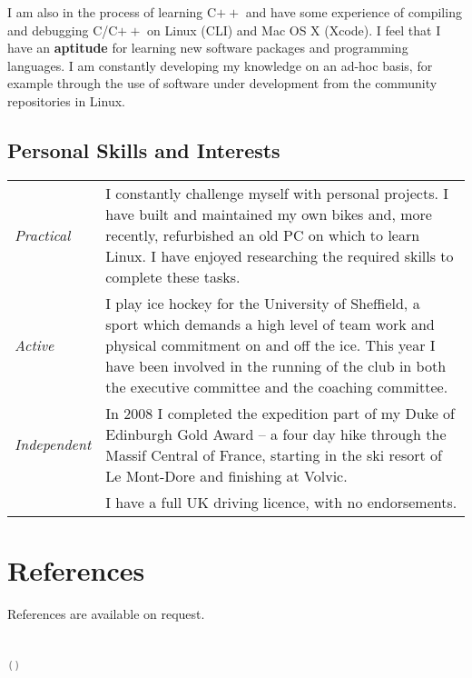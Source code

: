 \documentclass[oneside,a4paper]{article}
\begin{document}
I am also in the process of learning C$++$ and have some experience of compiling and debugging C/C$++$ on Linux (CLI) and Mac OS X (Xcode). I feel that I have an {\bf aptitude} for learning new software packages and programming languages. I am constantly developing my knowledge on an ad-hoc basis, for example  through the use of software under development from the community repositories in Linux.

\subsection*{Personal Skills and Interests}

\hspace{-6pt}\begin{tabular}{>{\it}lp{430pt}}
Practical & I constantly challenge myself with personal projects. I have built and maintained my own bikes and, more recently, refurbished an old PC on which to learn Linux. I have enjoyed researching the required skills to complete these tasks. \\[4pt]
Active & I play ice hockey for the University of Sheffield, a sport which demands a high level of team work and physical commitment on and off the ice. This year I have been involved in the running of the club in both the executive committee and the coaching committee. \\[4pt]
Independent & In 2008 I completed the expedition part of my Duke of Edinburgh Gold Award -- a four day hike through the Massif Central of France, starting in the ski resort of Le Mont-Dore and finishing at Volvic. \\[4pt]
& I have a full UK driving licence, with no endorsements.
\end{tabular}

\section*{References}

References are available on request.
\\\\\\
\small\texttt{\textcolor{Gray}{\VCDateTEX\;\;(\GITAbrHash)}}
\end{document}
